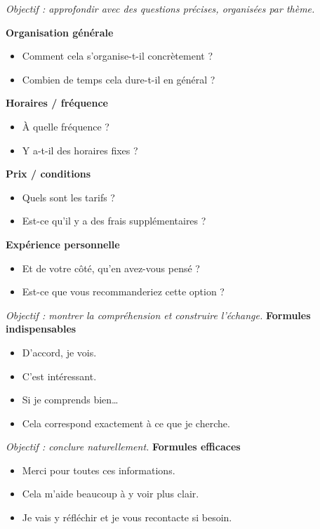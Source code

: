 \documentclass[12pt,a4paper]{article}
\begin{document}
\begin{tcolorbox}[title=\textbf{STEP 3 · Questions ciblées et progressives ($\approx$ 1 min 30)}]
\emph{Objectif : approfondir avec des questions précises, organisées par thème.}

\textbf{Organisation générale}
\begin{itemize}
  \item Comment cela s'organise-t-il concrètement ?
  \item Combien de temps cela dure-t-il en général ?
\end{itemize}

\textbf{Horaires / fréquence}
\begin{itemize}
  \item À quelle fréquence ?
  \item Y a-t-il des horaires fixes ?
\end{itemize}

\textbf{Prix / conditions}
\begin{itemize}
  \item Quels sont les tarifs ?
  \item Est-ce qu'il y a des frais supplémentaires ?
\end{itemize}

\textbf{Expérience personnelle}
\begin{itemize}
  \item Et de votre côté, qu'en avez-vous pensé ?
  \item Est-ce que vous recommanderiez cette option ?
\end{itemize}
\end{tcolorbox}

\begin{tcolorbox}[title=\textbf{STEP 4 · Réactions et relances (tout au long de l'échange)}]
\emph{Objectif : montrer la compréhension et construire l'échange.}
\textbf{Formules indispensables}
\begin{itemize}
  \item D'accord, je vois.
  \item C'est intéressant.
  \item Si je comprends bien…
  \item Cela correspond exactement à ce que je cherche.
\end{itemize}
\end{tcolorbox}

\begin{tcolorbox}[title=\textbf{STEP 5 · Clôture claire ($\approx$ 20–30 secondes)}]
\emph{Objectif : conclure naturellement.}
\textbf{Formules efficaces}
\begin{itemize}
  \item Merci pour toutes ces informations.
  \item Cela m'aide beaucoup à y voir plus clair.
  \item Je vais y réfléchir et je vous recontacte si besoin.
\end{itemize}
\end{tcolorbox}
\end{document}
